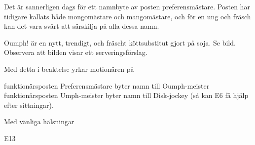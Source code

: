 \documentclass[../_main/handlingar.tex]{subfiles}
\begin{document}
Det är sannerligen dags för ett namnbyte av posten preferensmästare. Posten har tidigare kallats både mongomästare och mangomästare, och för en ung och fräsch kan det vara svårt att särskilja på alla dessa namn.

Oumph! är en nytt, trendigt, och fräscht köttsubstitut gjort på soja. Se bild. Observera att bilden visar ett serveringsförslag.

Med detta i beaktelse yrkar motionären på

\begin{attsatser}
  \att funktionärsposten Preferensmästare byter namn till Oumph-meister
  \att funktionärsposten Umph-meister byter namn till Disk-jockey (så kan E6 få hjälp efter sittningar).
\end{attsatser}

\begin{signatures}{1}
    Med vänliga hälsningar
    \signature{Johannes Koch}{E13}
\end{signatures}
\end{document}
